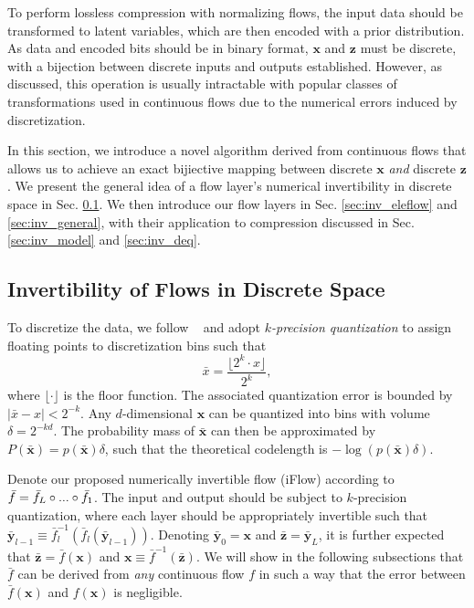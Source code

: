 \documentclass{article}
\newcommand{\quant}[1]{\bar{#1}}
\newcommand{\qv}[1]{\bar{\mathbf{#1}}}
\begin{document}
To perform lossless compression with normalizing flows, the input data should be transformed to latent variables, which are then encoded with a prior distribution. As data and encoded bits should be in binary format, $\mathbf{x}$ and $\mathbf{z}$ must be discrete, with a bijection between discrete inputs and outputs established. However, as discussed, this operation is usually intractable with popular classes of transformations used in continuous flows due to the numerical errors induced by discretization.

In this section, we introduce a novel algorithm derived from continuous flows that allows us to achieve an exact bijiective mapping between discrete $\mathbf{x}$ \textit{and} discrete $\mathbf{z}$. We present the general idea of a flow layer's numerical invertibility in discrete space in Sec. \ref{sec:k_precision}. We then introduce our flow layers in Sec. \ref{sec:inv_eleflow} and \ref{sec:inv_general}, with their application to compression discussed in Sec. \ref{sec:inv_model} and \ref{sec:inv_deq}.

\subsection{Invertibility of Flows in Discrete Space}
\label{sec:k_precision}

To discretize the data, we follow ~\cite{zhang2021ivpf} and adopt {\em $k$-precision quantization} to assign floating points to discretization bins such that
\begin{equation}
    \quant{x} = \frac{\lfloor 2^k \cdot x \rfloor}{2^k},
\label{eq:quantization}
\end{equation}
where $\lfloor \cdot \rfloor$ is the floor function. The associated quantization error is bounded by $|\quant{x} - x| < 2^{-k}$. Any $d$-dimensional $\mathbf{x}$ can be quantized into bins with volume $\delta = 2^{-kd}$. The probability mass of $\quant{\mathbf{x}}$ can then be approximated by $P(\quant{\mathbf{x}}) = p (\qv{x}) \delta$, such that the theoretical codelength is $-\log (p(\qv{x}) \delta)$.

Denote our proposed numerically invertible flow (iFlow) according to $\Bar{f} = \Bar{f}_L \circ ... \circ \Bar{f}_1$. The input and output should be subject to $k$-precision quantization, where each layer should be appropriately invertible such that $\qv{y}_{l-1} \equiv \quant{f}_l^{-1} (\quant{f}_l(\qv{y}_{l-1}))$. Denoting $\qv{y}_0=\mathbf{x}$ and $\qv{z}=\qv{y}_L$, it is further expected that $\qv{z} = \quant{f}(\mathbf{x})$ and $\mathbf{x} \equiv \quant{f}^{-1}(\qv{z})$. We will show in the following subsections that $\quant{f}$ can be derived from \textit{any} continuous flow $f$ in such a way that the error between $\quant{f} (\mathbf{x})$ and $f (\mathbf{x})$ is negligible.
\end{document}
